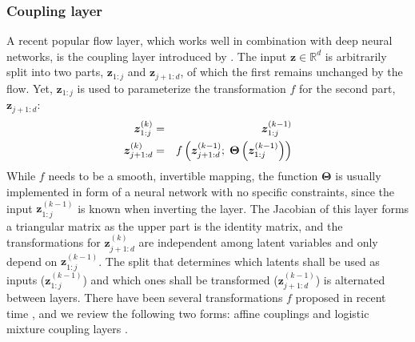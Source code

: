 \subsubsection{Coupling layer}
A recent popular flow layer, which works well in combination with deep neural networks, is the coupling layer introduced by \citet{RealNVP}. The input $\bm{z}\in\mathbb{R}^{d}$ is arbitrarily split into two parts, $\bm{z}_{1:j}$ and $\bm{z}_{j+1:d}$, of which the first remains unchanged by the flow. Yet, $\bm{z}_{1:j}$ is used to parameterize the transformation $f$ for the second part, $\bm{z}_{j+1:d}$: 
\begin{eqnarray}
	\bm{z}^{(k)}_{1:j} & = & \bm{z}^{(k-1)}_{1:j}\\
	\bm{z}^{(k)}_{j+1:d} & = & f\left(\bm{z}^{(k-1)}_{j+1:d};\hspace{1mm} \bm{\Theta}\left(\bm{z}^{(k-1)}_{1:j}\right)\right)
\end{eqnarray}
While $f$ needs to be a smooth, invertible mapping, the function $\bm{\Theta}$ is usually implemented in form of a neural network with no specific constraints, since the input $\bm{z}^{(k-1)}_{1:j}$ is known when inverting the layer. The Jacobian of this layer forms a triangular matrix as the upper part is the identity matrix, and the transformations for $\bm{z}^{(k)}_{j+1:d}$ are independent among latent variables and only depend on $\bm{z}^{(k-1)}_{1:j}$. The split that determines which latents shall be used as inputs ($\bm{z}^{(k-1)}_{1:j}$) and which ones shall be transformed ($\bm{z}^{(k-1)}_{j+1:d}$) is alternated between layers. There have been several transformations $f$ proposed in recent time \cite{NeuralSplineFlows, SemiDiscreteNFSequence, Flow++, NormalizingFlowsOverview}, and we review the following two forms: affine couplings \cite{RealNVP} and logistic mixture coupling layers \cite{Flow++}.

